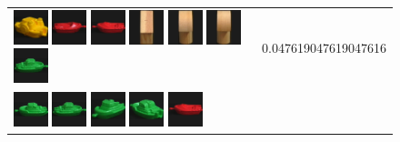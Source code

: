 \begin{figure}[!bp]
\begin{tabular}{m{11cm} | m{3cm} |}
\includegraphics[width=1cm]{coil/beeld-16.eps}
\includegraphics[width=1cm]{coil/beeld-19.eps}
\includegraphics[width=1cm]{coil/beeld-18.eps}
\includegraphics[width=1cm]{coil/beeld-47.eps}
\includegraphics[width=1cm]{coil/beeld-2.eps}
\includegraphics[width=1cm]{coil/beeld-5.eps}
\includegraphics[width=1cm]{coil/beeld-55.eps}
& {\scriptsize 0.047619047619047616}
\\
\includegraphics[width=1cm]{coil/beeld-54.eps}
\includegraphics[width=1cm]{coil/beeld-55.eps}
\includegraphics[width=1cm]{coil/beeld-57.eps}
\includegraphics[width=1cm]{coil/beeld-58.eps}
\includegraphics[width=1cm]{coil/beeld-18.eps}

\end{tabular}
\end{figure}
